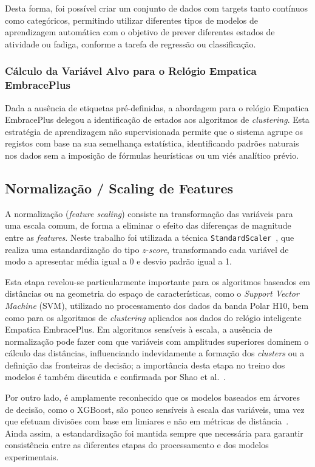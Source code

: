 Desta forma, foi possível criar um conjunto de dados com targets tanto contínuos como categóricos, permitindo utilizar diferentes tipos de modelos de aprendizagem automática com o objetivo de prever diferentes estados de atividade ou fadiga, conforme a tarefa de regressão ou classificação.

\subsubsection*{Cálculo da Variável Alvo para o Relógio Empatica EmbracePlus}

Dada a ausência de etiquetas pré-definidas, a abordagem para o relógio Empatica EmbracePlus delegou a identificação de estados aos algoritmos de \textit{clustering}. Esta estratégia de aprendizagem não supervisionada permite que o sistema agrupe os registos com base na sua semelhança estatística, identificando padrões naturais nos dados sem a imposição de fórmulas heurísticas ou um viés analítico prévio.

\subsection{Normalização / Scaling de Features}

A normalização (\textit{feature scaling}) consiste na transformação das variáveis para uma escala comum, de forma a eliminar o efeito das diferenças de magnitude entre as \textit{features}. Neste trabalho foi utilizada a técnica \texttt{StandardScaler}~\cite{scikitlearn2021standardscaler}, que realiza uma estandardização do tipo \textit{z-score}, transformando cada variável de modo a apresentar média igual a 0 e desvio padrão igual a 1.

Esta etapa revelou-se particularmente importante para os algoritmos baseados em distâncias ou na geometria do espaço de características, como o \textit{Support Vector Machine} (SVM), utilizado no processamento dos dados da banda Polar H10, bem como para os algoritmos de \textit{clustering} aplicados aos dados do relógio inteligente Empatica EmbracePlus. Em algoritmos sensíveis à escala, a ausência de normalização pode fazer com que variáveis com amplitudes superiores dominem o cálculo das distâncias, influenciando indevidamente a formação dos \textit{clusters} ou a definição das fronteiras de decisão; a importância desta etapa no treino dos modelos é também discutida e confirmada por Shao et al.~\cite{shao2020normalization}.

Por outro lado, é amplamente reconhecido que os modelos baseados em árvores de decisão, como o XGBoost, são pouco sensíveis à escala das variáveis, uma vez que efetuam divisões com base em limiares e não em métricas de distância~\cite{scikitlearn2026featurescaling}. Ainda assim, a estandardização foi mantida sempre que necessária para garantir consistência entre as diferentes etapas do processamento e dos modelos experimentais.

